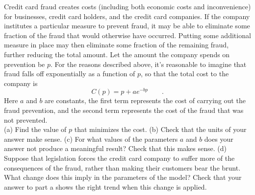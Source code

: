 Credit card fraud creates costs (including both economic costs and
inconvenience) for businesses, credit card holders, and the credit
card companies. If the company institutes a particular measure to
prevent fraud, it may be able to eliminate some fraction of the fraud
that would otherwise have occurred. Putting some additional measure in place
may then eliminate some fraction of the remaining fraud, further reducing
the total amount. Let the amount the company spends on prevention be $p$.
For the reasons described above, it's reasonable to imagine that fraud
falls off exponentially as a function of $p$, so that the total cost
to the company is
\begin{equation*}
  C(p) = p+ae^{-bp} \qquad .
\end{equation*}
Here $a$ and $b$ are constants, the first term represents the cost of
carrying out the fraud prevention, and the second term represents
the cost of the fraud that was not prevented.\\
(a) Find the value of $p$ that minimizes the cost.\answercheck\hwendpart
(b) Check that the units of your answer make sense.\hwendpart
(c) For what values of the parameters $a$ and
$b$ does your answer not produce a meaningful result? Check that this
makes sense.\hwendpart
(d) Suppose that legislation forces the credit card company to suffer
more of the consequences of the fraud, rather than making their customers
bear the brunt. What change does this imply in the parameters of the model?
Check that your answer to part a shows the right trend when this change
is applied.
